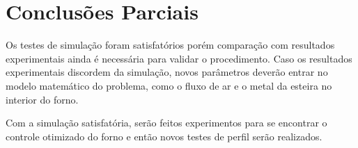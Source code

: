 \chapter{Conclusões Parciais}\label{conclusao}

Os testes de simulação foram satisfatórios porém comparação com resultados experimentais ainda é necessária para validar o procedimento. Caso os resultados experimentais discordem da simulação, novos parâmetros deverão entrar no modelo matemático do problema, como o fluxo de ar e o metal da esteira no interior do forno.  

Com a simulação satisfatória, serão feitos experimentos para se encontrar o controle otimizado do forno e então novos testes de perfil serão realizados.